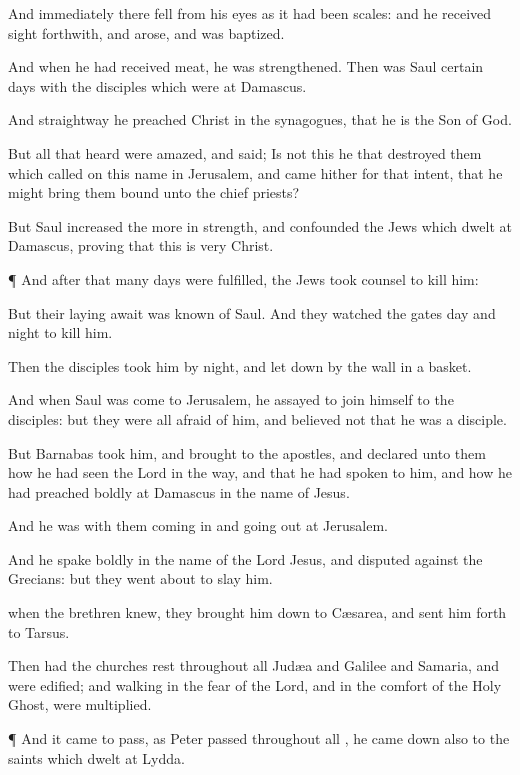 {And
immediately there
fell
from
his
eyes as it had
been
scales:
and he received
sight
forthwith,
and
arose, and was
baptized.

And when he had
received
meat, he was
strengthened.
Then
was
Saul
certain
days
with the
disciples which
were
at
Damascus.

And
straightway he
preached
Christ
in the
synagogues,
that
he
is the
Son of
God.

But
all
that
heard
{} were
amazed,
and
said;
Is
not
this he
that
destroyed them
which called
on
this
name
in
Jerusalem,
and
came
hither
for that
intent,
that he might
bring
them
bound
unto the chief
priests?

But
Saul
increased the
more in
strength,
and
confounded the
Jews
which
dwelt
at
Damascus,
proving
that
this
is
very
Christ.


\par }{\PP {}¶
And after
that
many
days were
fulfilled, the
Jews took
counsel to
kill
him:

But
their laying
await was
known of
Saul.
And they
watched the
gates
day
and
night
to
kill
him.

Then the
disciples
took
him by
night, and
let
{}
down
by the
wall
in a
basket.

And when
Saul was
come
to
Jerusalem, he
assayed to join
himself to the
disciples:
but they
were
all
afraid of
him, and
believed
not
that he
was a
disciple.

But
Barnabas
took
him, and
brought
{}
to the
apostles,
and
declared unto
them
how he had
seen the
Lord
in the
way,
and
that he had spoken
to
him,
and
how he had preached
boldly
at
Damascus
in the
name of
Jesus.

And he
was
with
them coming
in
and going
out
at
Jerusalem.

And he spake
boldly
in the
name of the
Lord
Jesus,
and
disputed
against the
Grecians:
but they went
about to
slay
him.

when the
brethren
knew, they
brought
him
down
to
Cæsarea,
and
sent
him
forth
to
Tarsus.

Then
had the
churches
rest
throughout
all
Judæa
and
Galilee
and
Samaria, and were
edified;
and
walking in the
fear of the
Lord,
and in the
comfort of the
Holy
Ghost, were
multiplied.


\par }{\PP {}¶
And it came to
pass, as
Peter
passed
throughout
all
{}, he came
down
also
to the
saints
which
dwelt at
Lydda.

}
